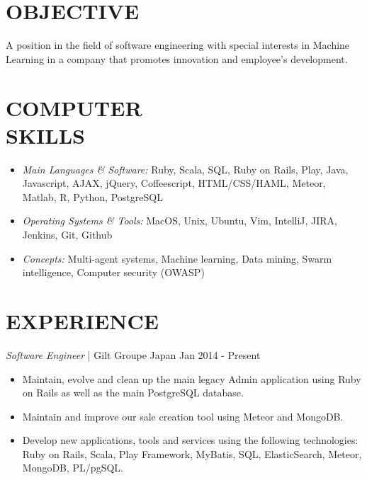 \documentclass[line, margin]{res}
\begin{document}
\address{ 151-0051 Tokyo, Shibuya, Sendagaya 3-7-8 Urbanex Harajuku 605 }
\address{ abalonperin1@gmail.com | https://linkedin.com/in/abalonperin | https://github.com/zolrag13 }
 
\begin{resume}
 
\section{OBJECTIVE} A position in the field of software engineering with special interests in Machine Learning in a company that promotes innovation and employee's development. 
 
\section{COMPUTER \\ SKILLS} 
                 \begin{itemize}  \itemsep -1pt %
                  \item {\sl Main Languages \& Software:} Ruby, Scala, SQL, Ruby on Rails, Play, Java, Javascript, AJAX, jQuery, Coffeescript,
  HTML/CSS/HAML, Meteor, Matlab, R, Python, PostgreSQL
                  \item {\sl Operating Systems \& Tools:} MacOS, Unix, Ubuntu, Vim, IntelliJ, JIRA, Jenkins, Git, Github
                  \item {\sl Concepts:} Multi-agent systems, Machine learning, Data mining, Swarm intelligence, Computer security (OWASP)
                \end{itemize}
 
\section{EXPERIENCE} {\sl Software Engineer} | Gilt Groupe Japan \hfill Jan 2014 - Present\\
                 \begin{itemize}  \itemsep -1pt %
                  \item  Maintain, evolve and clean up the main legacy Admin application using Ruby on Rails as well as
                    the main PostgreSQL database.
                  \item  Maintain and improve our sale creation tool using Meteor and MongoDB.
                  \item  Develop new applications, tools and services using the following technologies: Ruby on Rails,
                    Scala, Play Framework, MyBatis, SQL, ElasticSearch, Meteor, MongoDB, PL/pgSQL.
                 \end{itemize}
 

\end{resume}
\end{document}
